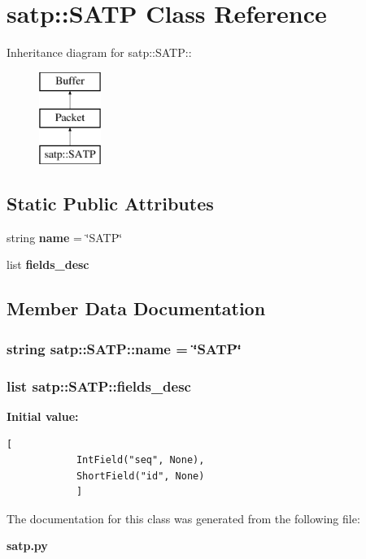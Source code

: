 \section{satp::SATP Class Reference}
\label{classsatp_1_1SATP}
Inheritance diagram for satp::SATP::\begin{figure}[H]
\begin{center}
\leavevmode
\includegraphics[height=3cm]{classsatp_1_1SATP}
\end{center}
\end{figure}
\subsection*{Static Public Attributes}
\begin{CompactItemize}
\item 
string {\bf name} = \char`\"{}SATP\char`\"{}
\item 
list {\bf fields\_\-desc}
\end{CompactItemize}


\subsection{Member Data Documentation}
\subsubsection{\setlength{\rightskip}{0pt plus 5cm}string {\bf satp::SATP::name} = \char`\"{}SATP\char`\"{}\hspace{0.3cm}{\tt  [static]}}\label{classsatp_1_1SATP_e9e415324a6a9fbe14971c1ffd334139}


\subsubsection{\setlength{\rightskip}{0pt plus 5cm}list {\bf satp::SATP::fields\_\-desc}\hspace{0.3cm}{\tt  [static]}}\label{classsatp_1_1SATP_e51015e8537b5ec7aa53ba87bf638c15}


\textbf{Initial value:}

\begin{Code}\begin{verbatim}[
            IntField("seq", None),
            ShortField("id", None)
            ]
\end{verbatim}\end{Code}


The documentation for this class was generated from the following file:\begin{CompactItemize}
\item 
{\bf satp.py}\end{CompactItemize}
